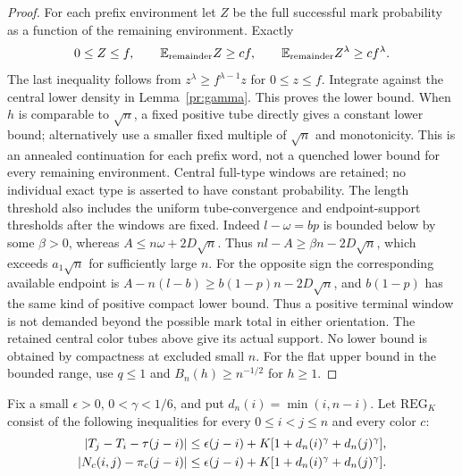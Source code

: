 \begin{proof}
For each prefix environment let $Z$ be the full successful mark probability
as a function of the remaining environment. Exactly
\begin{equation}
 0\le Z\le f,\qquad \mathbb E_{\rm remainder}Z\ge cf,
 \qquad \mathbb E_{\rm remainder}Z^\lambda\ge cf^\lambda.
 \label{pr:concavecontinue}
\end{equation}
The last inequality follows from $z^\lambda\ge f^{\lambda-1}z$ for
$0\le z\le f$. Integrate against the central lower density in
Lemma~\ref{pr:gamma}. This proves the lower bound. When $h$ is comparable
to $\sqrt n$, a fixed positive tube directly gives a constant lower
bound; alternatively use a smaller fixed multiple of $\sqrt n$ and
monotonicity. This is an annealed continuation for each prefix word,
not a quenched lower bound for every remaining environment. Central
full-type windows are retained; no individual exact type is asserted
to have constant probability.
The length threshold also includes the uniform tube-convergence and
endpoint-support thresholds after the windows are fixed. Indeed
$l-\omega=bp$ is bounded below by some $\beta>0$, whereas
$A\le n\omega+2D\sqrt n$. Thus
$nl-A\ge\beta n-2D\sqrt n$, which exceeds $a_1\sqrt n$
for sufficiently large $n$. For the opposite sign the corresponding
available endpoint is $A-n(l-b)\ge b(1-p)n-2D\sqrt n$, and $b(1-p)$
has the same kind of positive compact lower bound. Thus a positive
terminal window is not demanded beyond the possible mark total in
either orientation. The retained central color tubes above
give its actual support. No lower bound is obtained by compactness at
excluded small $n$. For the flat upper bound in the bounded range, use
$q\le1$ and $B_n(h)\ge n^{-1/2}$ for $h\ge1$.
\end{proof}

Fix a small $\epsilon>0$, $0<\gamma<1/6$, and put $d_n(i)=\min(i,n-i)$.
Let $\mathrm{REG}_K$ consist of the following inequalities for every
$0\le i<j\le n$ and every color $c$:
\begin{align}
 |T_j-T_i-\tau(j-i)|&\le\epsilon(j-i)
               +K[1+d_n(i)^\gamma+d_n(j)^\gamma],\notag\\
 |N_c(i,j)-\pi_c(j-i)|&\le\epsilon(j-i)
               +K[1+d_n(i)^\gamma+d_n(j)^\gamma].           \label{pr:REG}
\end{align}

